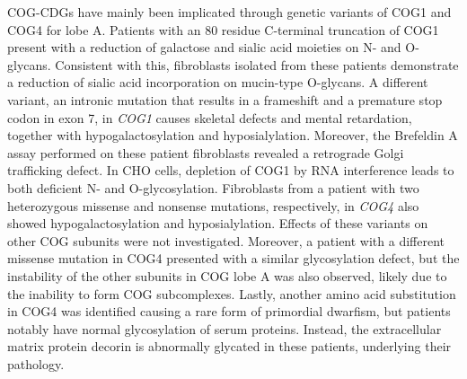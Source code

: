 COG-CDGs have mainly been implicated through genetic variants of COG1 and COG4 for lobe A. Patients with an 80 residue C-terminal truncation of COG1 present with a reduction of galactose and sialic acid moieties on N- and O-glycans. Consistent with this, fibroblasts isolated from these patients demonstrate a reduction of sialic acid incorporation on mucin-type O-glycans\cite{foulquier_conserved_2006}. A different variant, an intronic mutation that results in a frameshift and a premature stop codon in exon 7, in \emph{COG1} causes skeletal defects and mental retardation, together with hypogalactosylation and hyposialylation\cite{zeevaert_cerebrocostomandibular-like_2009}. Moreover, the Brefeldin A assay performed on these patient fibroblasts revealed a retrograde Golgi trafficking defect. In CHO cells, depletion of COG1 by RNA interference leads to both deficient N- and O-glycosylation\cite{oka_cog_2004,blackburn_maintaining_2019}. Fibroblasts from a patient with two heterozygous missense and nonsense mutations, respectively, in \emph{COG4} also showed hypogalactosylation and hyposialylation\cite{ng_identification_2011,miura_clinical_2005}. Effects of these variants on other COG subunits were not investigated. Moreover, a patient with a different missense mutation in COG4 presented with a similar glycosylation defect, but the instability of the other subunits in COG lobe A was also observed, likely due to the inability to form COG subcomplexes\cite{reynders_golgi_2009}. Lastly, another amino acid substitution in COG4 was identified causing a rare form of primordial dwarfism, but patients notably have normal glycosylation of serum proteins\cite{ferreira_recurrent_2018}. Instead, the extracellular matrix protein decorin is abnormally glycated in these patients, underlying their pathology.

